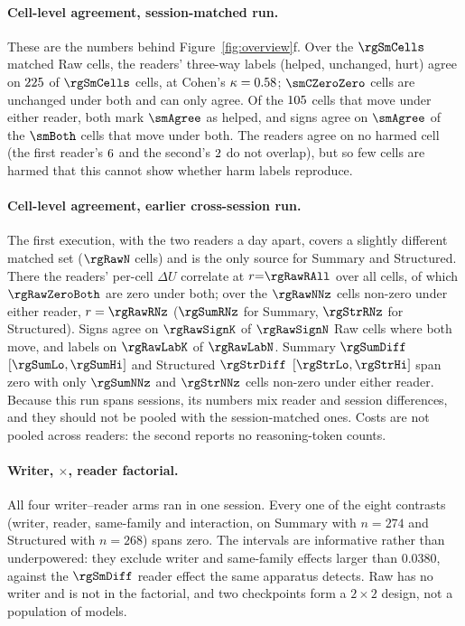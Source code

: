 \paragraph{Cell-level agreement, session-matched run.}
These are the numbers behind Figure~\ref{fig:overview}f. Over the
$\rgSmCells$ matched Raw cells, the readers' three-way labels (helped,
unchanged, hurt) agree on $225$ of $\rgSmCells$ cells, at Cohen's
$\kappa = 0.58$; $\smCZeroZero$ cells are unchanged under both and
can only agree. Of the $105$ cells that move under either reader,
both mark $\smAgree$ as helped, and signs agree on $\smAgree$ of the $\smBoth$
cells that move under both. The readers agree on no harmed cell (the first
reader's $6$ and the second's $2$ do not overlap), but so few cells
are harmed that this cannot show whether harm labels reproduce.

\paragraph{Cell-level agreement, earlier cross-session run.}
The first execution, with the two readers a day apart, covers a slightly
different matched set ($\rgRawN$ cells) and is the only source for Summary and
Structured. There the readers' per-cell $\Delta U$ correlate at
$r{=}\rgRawRAll$ over all cells, of which $\rgRawZeroBoth$ are zero under both;
over the $\rgRawNNz$ cells non-zero under either reader, $r = \rgRawRNz$
($\rgSumRNz$ for Summary, $\rgStrRNz$ for Structured). Signs agree on
$\rgRawSignK$ of $\rgRawSignN$ Raw cells where both move, and labels on
$\rgRawLabK$ of $\rgRawLabN$. Summary $\rgSumDiff$ $[\rgSumLo, \rgSumHi]$ and
Structured $\rgStrDiff$ $[\rgStrLo, \rgStrHi]$ span zero with only
$\rgSumNNz$ and $\rgStrNNz$ cells non-zero under either reader. Because this
run spans sessions, its numbers mix reader and session differences, and they
should not be pooled with the session-matched ones. Costs are not pooled
across readers: the second reports no reasoning-token counts.

\paragraph{Writer, $\times$, reader factorial.}
\label{sec:factorial}
All four writer--reader arms ran in one session. Every one of the eight
contrasts (writer, reader, same-family and interaction, on Summary with
$n{=}274$ and Structured with $n{=}268$) spans zero. The intervals are
informative rather than underpowered: they exclude writer and same-family
effects larger than $0.0380$, against the $\rgSmDiff$ reader effect the same
apparatus detects. Raw has no writer and is not in the factorial, and two
checkpoints form a $2\times2$ design, not a population of models.
